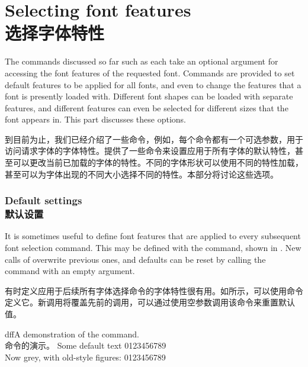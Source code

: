 \documentclass[a4paper]{l3doc}
\begin{document}
\part{Selecting font features\\选择字体特性}
\label{sec:selectingfeature}

The commands discussed so far such as  each take an optional argument for
accessing the font features of the requested font.
Commands are provided to set default features to be applied for all fonts, and even to change the features that a font is presently loaded with.
Different font shapes can be loaded with separate features, and different features can even be selected for different sizes that the font appears in.
This part discusses these options.

到目前为止，我们已经介绍了一些命令，例如，每个命令都有一个可选参数，用于访问请求字体的字体特性。提供了一些命令来设置应用于所有字体的默认特性，甚至可以更改当前已加载的字体的特性。不同的字体形状可以使用不同的特性加载，甚至可以为字体出现的不同大小选择不同的特性。本部分将讨论这些选项。


\section{Default settings\\默认设置}
\label{sec:defaults}


It is sometimes useful to define
font features that are applied to every subsequent font selection command.
This may be defined with the
 command, shown in .
New calls of  overwrite previous ones, and defaults can be reset by calling the command with an empty argument.

有时定义应用于后续所有字体选择命令的字体特性很有用。如所示，可以使用命令定义它。新调用将覆盖先前的调用，可以通过使用空参数调用该命令来重置默认值。

\begin{Xexample}{dff}{A demonstration of the  command.\\命令的演示。}
  Some default text 0123456789 \\
  Now grey, with old-style figures:
  0123456789
\end{Xexample}
\end{document}
